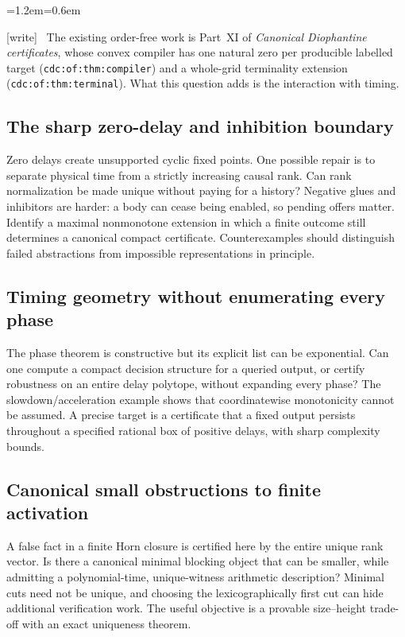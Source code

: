 \documentclass[11pt,letterpaper]{article}
\theoremstyle{definition}
\theoremstyle{remark}
\newcommand{\wtag}{\textup{[write]}}
\newenvironment{writenote}{\par\smallskip\begin{list}{}{\leftmargin=1.2em\rightmargin=0.6em}\item[]\small\wtag\ }{\end{list}\smallskip}
\newcommand{\lab}[1]{\nolinkurl{#1}}
\begin{document}
\begin{writenote}
The existing order-free work is Part~XI of \emph{Canonical Diophantine certificates}, whose convex compiler has one natural zero per producible labelled target (\lab{cdc:of:thm:compiler}) and a whole-grid terminality extension (\lab{cdc:of:thm:terminal}). What this question adds is the interaction with timing.
\end{writenote}

\subsection{The sharp zero-delay and inhibition boundary}
Zero delays create unsupported cyclic fixed points. One possible repair
is to separate physical time from a strictly increasing causal rank.
Can rank normalization be made unique without paying for a history?
Negative glues and inhibitors are harder: a body can cease being enabled,
so pending offers matter. Identify a maximal nonmonotone extension in
which a finite outcome still determines a canonical compact certificate.
Counterexamples should distinguish failed abstractions from impossible
representations in principle.

\subsection{Timing geometry without enumerating every phase}
The phase theorem is constructive but its explicit list can be
exponential. Can one compute a compact decision structure for a queried
output, or certify robustness on an entire delay polytope, without
expanding every phase? The slowdown/acceleration example shows that
coordinatewise monotonicity cannot be assumed. A precise target is a
certificate that a fixed output persists throughout a specified rational
box of positive delays, with sharp complexity bounds.

\subsection{Canonical small obstructions to finite activation}
A false fact in a finite Horn closure is certified here by the entire
unique rank vector. Is there a canonical minimal blocking object that
can be smaller, while admitting a polynomial-time, unique-witness
arithmetic description? Minimal cuts need not be unique, and choosing
the lexicographically first cut can hide additional verification work.
The useful objective is a provable size--height trade-off with an exact
uniqueness theorem.
\end{document}
